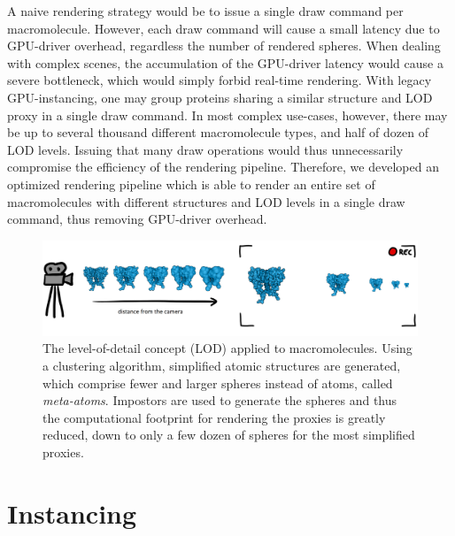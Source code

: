 A naive rendering strategy would be to issue a single draw command per macromolecule.
However, each draw command will cause a small latency due to GPU-driver overhead, regardless the number of rendered spheres.
When dealing with complex scenes, the accumulation of the GPU-driver latency would cause a severe bottleneck, which would simply forbid real-time rendering.
With legacy GPU-instancing, one may group proteins sharing a similar structure and LOD proxy in a single draw command.
In most complex use-cases, however, there may be up to several thousand different macromolecule types, and half of dozen of LOD levels.
Issuing that many draw operations would thus unnecessarily compromise the efficiency of the rendering pipeline.
Therefore, we developed an optimized rendering pipeline which is able to render an entire set of macromolecules with different structures and LOD levels in a single draw command, thus removing GPU-driver overhead.

\begin{figure}
\centering
\includegraphics[width=0.99\linewidth]{graphics/lod}
\caption{The level-of-detail concept (LOD) applied to macromolecules. Using a clustering algorithm, simplified atomic structures are generated, which comprise fewer and larger spheres instead of atoms, called \textit{meta-atoms}.
Impostors are used to generate the spheres and thus the computational footprint for rendering the proxies is greatly reduced, down to only a few dozen of spheres for the most simplified proxies.}
\label{fig:lod}
\end{figure}

\section{Instancing}

